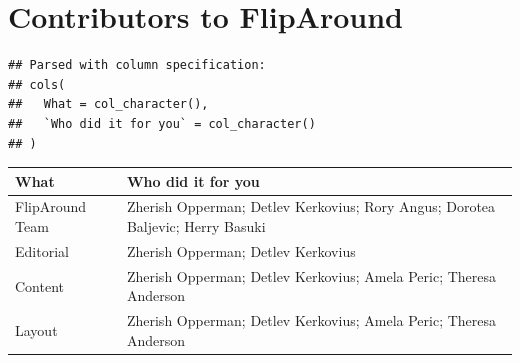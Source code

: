 \documentclass[]{book}
\theoremstyle{definition}
\theoremstyle{definition}
\theoremstyle{remark}
\begin{document}
\chapter{Contributors to FlipAround}\label{contributors-to-fliparound}

\begin{verbatim}
## Parsed with column specification:
## cols(
##   What = col_character(),
##   `Who did it for you` = col_character()
## )
\end{verbatim}

\begin{tabular}{l|l}
\hline
What & Who did it for you\\
\hline
FlipAround Team & Zherish Opperman; Detlev Kerkovius; Rory Angus; Dorotea Baljevic; Herry Basuki\\
\hline
Editorial & Zherish Opperman; Detlev Kerkovius\\
\hline
Content & Zherish Opperman; Detlev Kerkovius; Amela Peric; Theresa Anderson\\
\hline
Layout & Zherish Opperman; Detlev Kerkovius; Amela Peric; Theresa Anderson\\
\hline
\end{tabular}
\end{document}
